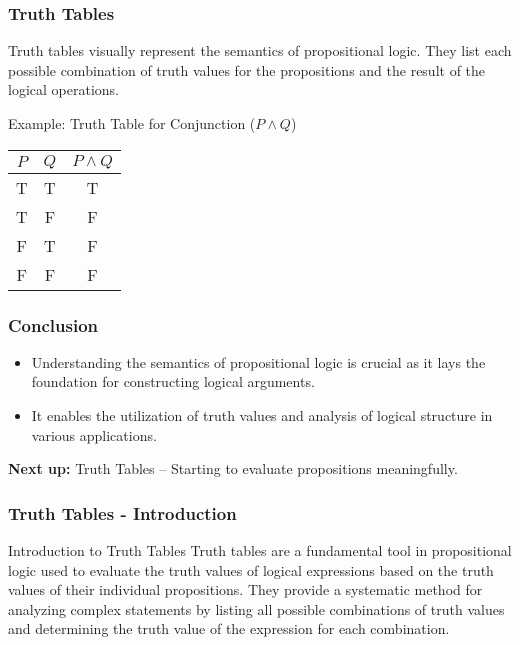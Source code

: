 \documentclass[aspectratio=169]{beamer}
\begin{document}
\begin{frame}[fragile]
  \frametitle{Truth Tables}
  Truth tables visually represent the semantics of propositional logic. They list each possible combination of truth values for the propositions and the result of the logical operations.

  \begin{block}{Example: Truth Table for Conjunction ($P \land Q$)}
  \begin{tabular}{|c|c|c|}
    \hline
    $P$ & $Q$ & $P \land Q$ \\
    \hline
    T   & T   & T    \\
    T   & F   & F    \\
    F   & T   & F    \\
    F   & F   & F    \\
    \hline
  \end{tabular}
  \end{block}
\end{frame}

\begin{frame}[fragile]
  \frametitle{Conclusion}
  \begin{itemize}
    \item Understanding the semantics of propositional logic is crucial as it lays the foundation for constructing logical arguments.
    \item It enables the utilization of truth values and analysis of logical structure in various applications.
  \end{itemize}

  \textbf{Next up:} Truth Tables – Starting to evaluate propositions meaningfully.
\end{frame}

\begin{frame}[fragile]
    \frametitle{Truth Tables - Introduction}
    \begin{block}{Introduction to Truth Tables}
        Truth tables are a fundamental tool in propositional logic used to evaluate the truth values of logical expressions based on the truth values of their individual propositions. They provide a systematic method for analyzing complex statements by listing all possible combinations of truth values and determining the truth value of the expression for each combination.
    \end{block}
\end{frame}
\end{document}
